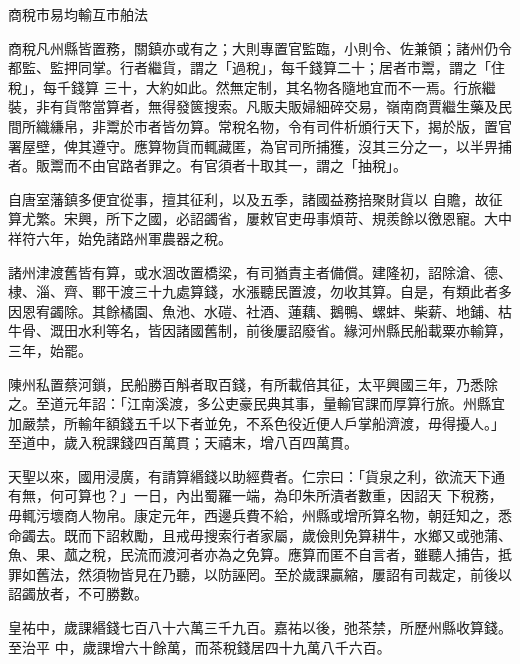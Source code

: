 
\begin{pinyinscope}

 商稅市易均輸互市舶法



 商稅凡州縣皆置務，關鎮亦或有之；大則專置官監臨，小則令、佐兼領；諸州仍令都監、監押同掌。行者繼貨，謂之「過稅」，每千錢算二十；居者市鬻，謂之「住稅」，每千錢算
 三十，大約如此。然無定制，其名物各隨地宜而不一焉。行旅繼裝，非有貨幣當算者，無得發篋搜索。凡販夫販婦細碎交易，嶺南商賈繼生藥及民間所織縑帛，非鬻於市者皆勿算。常稅名物，令有司件析頒行天下，揭於版，置官署屋壁，俾其遵守。應算物貨而輒藏匿，為官司所捕獲，沒其三分之一，以半畀捕者。販鬻而不由官路者罪之。有官須者十取其一，謂之「抽稅」。



 自唐室藩鎮多便宜從事，擅其征利，以及五季，諸國益務掊聚財貨以
 自贍，故征算尤繁。宋興，所下之國，必詔蠲省，屢敕官吏毋事煩苛、規羨餘以徼恩寵。大中祥符六年，始免諸路州軍農器之稅。



 諸州津渡舊皆有算，或水涸改置橋梁，有司猶責主者備償。建隆初，詔除滄、德、棣、淄、齊、鄆干渡三十九處算錢，水漲聽民置渡，勿收其算。自是，有類此者多因恩宥蠲除。其餘橘園、魚池、水磑、社酒、蓮藕、鵝鴨、螺蚌、柴薪、地鋪、枯牛骨、溉田水利等名，皆因諸國舊制，前後屢詔廢省。緣河州縣民船載粟亦輸算，三年，始罷。



 陳州私置蔡河鎖，民船勝百斛者取百錢，有所載倍其征，太平興國三年，乃悉除之。至道元年詔：「江南溪渡，多公吏豪民典其事，量輸官課而厚算行旅。州縣宜加嚴禁，所輸年額錢五千以下者並免，不系色役近便人戶掌船濟渡，毋得擾人。」至道中，歲入稅課錢四百萬貫；天禧末，增八百四萬貫。



 天聖以來，國用浸廣，有請算緡錢以助經費者。仁宗曰：「貨泉之利，欲流天下通有無，何可算也？」一日，內出蜀羅一端，為印朱所漬者數重，因詔天
 下稅務，毋輒污壞商人物帛。康定元年，西邊兵費不給，州縣或增所算名物，朝廷知之，悉命蠲去。既而下詔敕勵，且戒毋搜索行者家屬，歲儉則免算耕牛，水鄉又或弛蒲、魚、果、蓏之稅，民流而渡河者亦為之免算。應算而匿不自言者，雖聽人捕告，抵罪如舊法，然須物皆見在乃聽，以防誣罔。至於歲課贏縮，屢詔有司裁定，前後以詔蠲放者，不可勝數。



 皇祐中，歲課緡錢七百八十六萬三千九百。嘉祐以後，弛茶禁，所歷州縣收算錢。至治平
 中，歲課增六十餘萬，而茶稅錢居四十九萬八千六百。




\end{pinyinscope}
